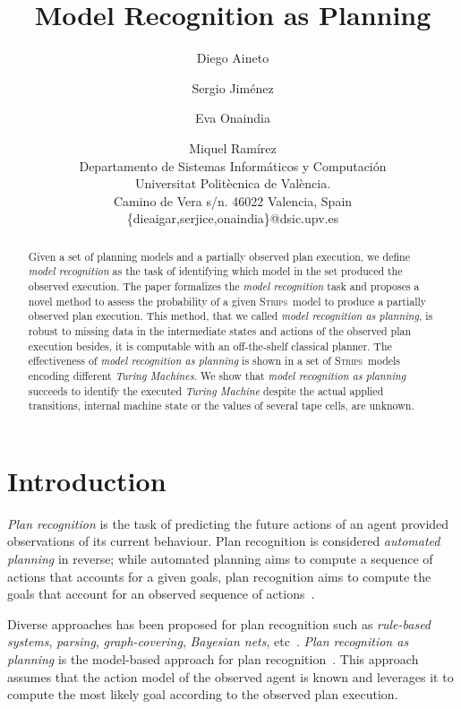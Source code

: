 \documentclass[letterpaper]{article} %
\newcommand{\strips}{\textsc{Strips}}     %
\begin{document}
\title{Model Recognition as Planning}

\author{Diego Aineto\and Sergio Jim\'enez\and Eva Onaindia \and Miquel Ram\'irez\\
{\small Departamento de Sistemas Inform\'aticos y Computaci\'on}\\
{\small Universitat Polit\`ecnica de Val\`encia.}\\
{\small Camino de Vera s/n. 46022 Valencia, Spain}\\
{\small \{dieaigar,serjice,onaindia\}@dsic.upv.es}}



\maketitle
\begin{abstract} 
Given a set of planning models and a partially observed plan execution, we define {\em model recognition} as the task of identifying which model in the set produced the observed execution. The paper formalizes the {\em model recognition} task and proposes a novel method to assess the probability of a given \strips\ model to produce a partially observed plan execution. This method, that we called {\em model recognition as planning}, is robust to missing data in the intermediate states and actions of the observed plan execution besides, it is computable with an off-the-shelf classical planner. The effectiveness of {\em model recognition as planning} is shown in a set of \strips\ models encoding different {\em Turing Machines}. We show that {\em model recognition as planning} succeeds to identify the executed {\em Turing Machine} despite the actual applied transitions, internal machine state or the values of several tape cells, are unknown.
\end{abstract}


\section{Introduction}
\label{sec:introduction}
{\em Plan recognition} is the task of predicting the future actions of an agent provided observations of its current behaviour. Plan recognition is considered {\em automated planning} in reverse; while automated planning aims to compute a sequence of actions that accounts for a given goals, plan recognition aims to compute the goals that account for an observed sequence of actions~\cite{geffner:book:2013}.

Diverse approaches has been proposed for plan recognition such as {\em rule-based systems}, {\em parsing}, {\em graph-covering}, {\em Bayesian nets}, etc~\cite{carberry2001techniques}. {\em Plan recognition as planning} is the model-based approach for plan recognition~\cite{ramirez2012plan,ramirez2009plan}. This approach assumes that the action model of the observed agent is known and leverages it to compute the most likely goal according to the observed plan execution.
\end{document}

